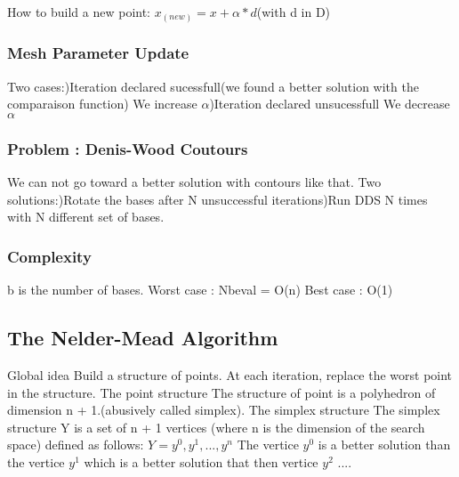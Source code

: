 How to build a new point:\newline
$x_(new) = x+\alpha*d $(with d in D)
\subsubsection{Mesh Parameter Update}
Two cases:)Iteration declared sucessfull(we found a better solution with the comparaison function)\newline
We increase $\alpha$)Iteration declared unsucessfull\newline
We decrease $\alpha$\newline

\subsubsection{Problem : Denis-Wood Coutours}
We can not go toward a better solution with contours like that.\newline
Two solutions:)Rotate the bases after N unsuccessful iterations)Run DDS N times with N different set of bases.\newline

\subsubsection{Complexity}
b is the number of bases.
Worst case : Nbeval = O(n)
Best case : O(1)

\subsection{The Nelder-Mead Algorithm}
Global idea\newline
Build a structure of points.\newline
At each iteration, replace the worst point in the structure.\newline
The point structure\newline
The structure of point is a polyhedron of dimension n + 1.(abusively called simplex).\newline
The simplex structure\newline
The simplex structure Y is a set of n + 1 vertices (where n is the
dimension of the search space) defined as follows:\newline
$Y = {y^0,y^1,...,y^n}$\newline
The vertice $y^0$ is a better solution than the vertice $y^1$ which is a better solution that then vertice $y^2$ ....
